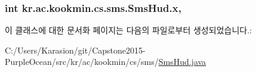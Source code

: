 \subsubsection[{x}]{\setlength{\rightskip}{0pt plus 5cm}int kr.\+ac.\+kookmin.\+cs.\+sms.\+Sms\+Hud.\+x\hspace{0.3cm}{\ttfamily [static]}, {\ttfamily [private]}}\label{classkr_1_1ac_1_1kookmin_1_1cs_1_1sms_1_1_sms_hud_a6686da2137e471f3bf9cd38b5fa8eaa5}


이 클래스에 대한 문서화 페이지는 다음의 파일로부터 생성되었습니다.\+:\begin{DoxyCompactItemize}
\item 
C\+:/\+Users/\+Karasion/git/\+Capstone2015-\/\+Purple\+Ocean/src/kr/ac/kookmin/cs/sms/\hyperlink{_sms_hud_8java}{Sms\+Hud.\+java}\end{DoxyCompactItemize}
